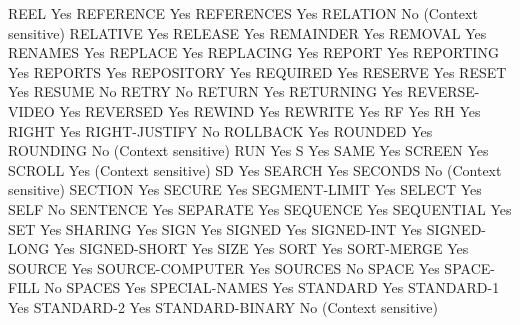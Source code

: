 REEL                            Yes
REFERENCE                       Yes
REFERENCES                      Yes
RELATION                        No (Context sensitive)
RELATIVE                        Yes
RELEASE                         Yes
REMAINDER                       Yes
REMOVAL                         Yes
RENAMES                         Yes
REPLACE                         Yes
REPLACING                       Yes
REPORT                          Yes
REPORTING                       Yes
REPORTS                         Yes
REPOSITORY                      Yes
REQUIRED                        Yes
RESERVE                         Yes
RESET                           Yes
RESUME                          No
RETRY                           No
RETURN                          Yes
RETURNING                       Yes
REVERSE-VIDEO                   Yes
REVERSED                        Yes
REWIND                          Yes
REWRITE                         Yes
RF                              Yes
RH                              Yes
RIGHT                           Yes
RIGHT-JUSTIFY                   No
ROLLBACK                        Yes
ROUNDED                         Yes
ROUNDING                        No (Context sensitive)
RUN                             Yes
S                               Yes
SAME                            Yes
SCREEN                          Yes
SCROLL                          Yes (Context sensitive)
SD                              Yes
SEARCH                          Yes
SECONDS                         No (Context sensitive)
SECTION                         Yes
SECURE                          Yes
SEGMENT-LIMIT                   Yes
SELECT                          Yes
SELF                            No
SENTENCE                        Yes
SEPARATE                        Yes
SEQUENCE                        Yes
SEQUENTIAL                      Yes
SET                             Yes
SHARING                         Yes
SIGN                            Yes
SIGNED                          Yes
SIGNED-INT                      Yes
SIGNED-LONG                     Yes
SIGNED-SHORT                    Yes
SIZE                            Yes
SORT                            Yes
SORT-MERGE                      Yes
SOURCE                          Yes
SOURCE-COMPUTER                 Yes
SOURCES                         No
SPACE                           Yes
SPACE-FILL                      No
SPACES                          Yes
SPECIAL-NAMES                   Yes
STANDARD                        Yes
STANDARD-1                      Yes
STANDARD-2                      Yes
STANDARD-BINARY                 No (Context sensitive)
